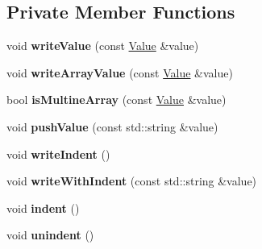 \subsection*{Private Member Functions}
\begin{DoxyCompactItemize}
\item 
\hypertarget{class_json_1_1_styled_writer_ac40143cf43f7c4a94d3d0b41e5245069}{}void {\bfseries write\+Value} (const \hyperlink{class_json_1_1_value}{Value} \&value)\label{class_json_1_1_styled_writer_ac40143cf43f7c4a94d3d0b41e5245069}

\item 
\hypertarget{class_json_1_1_styled_writer_a0618c23d62965515def15ece1e677f5d}{}void {\bfseries write\+Array\+Value} (const \hyperlink{class_json_1_1_value}{Value} \&value)\label{class_json_1_1_styled_writer_a0618c23d62965515def15ece1e677f5d}

\item 
\hypertarget{class_json_1_1_styled_writer_aa5dc671edf10b9976f1511da2271ab9d}{}bool {\bfseries is\+Multine\+Array} (const \hyperlink{class_json_1_1_value}{Value} \&value)\label{class_json_1_1_styled_writer_aa5dc671edf10b9976f1511da2271ab9d}

\item 
\hypertarget{class_json_1_1_styled_writer_aba120a1ff1b84411b32039188e8fb49f}{}void {\bfseries push\+Value} (const std\+::string \&value)\label{class_json_1_1_styled_writer_aba120a1ff1b84411b32039188e8fb49f}

\item 
\hypertarget{class_json_1_1_styled_writer_a885f4bfb5701896d60eee6716d2db7e4}{}void {\bfseries write\+Indent} ()\label{class_json_1_1_styled_writer_a885f4bfb5701896d60eee6716d2db7e4}

\item 
\hypertarget{class_json_1_1_styled_writer_a7b3cc9da3cb455ee9b2752307ac21b58}{}void {\bfseries write\+With\+Indent} (const std\+::string \&value)\label{class_json_1_1_styled_writer_a7b3cc9da3cb455ee9b2752307ac21b58}

\item 
\hypertarget{class_json_1_1_styled_writer_a0b65be6186a7c6638270990265e42b97}{}void {\bfseries indent} ()\label{class_json_1_1_styled_writer_a0b65be6186a7c6638270990265e42b97}

\item 
\hypertarget{class_json_1_1_styled_writer_acee1c9285519b573cfcb00b7e7f5a809}{}void {\bfseries unindent} ()\label{class_json_1_1_styled_writer_acee1c9285519b573cfcb00b7e7f5a809}


\end{DoxyCompactItemize}
